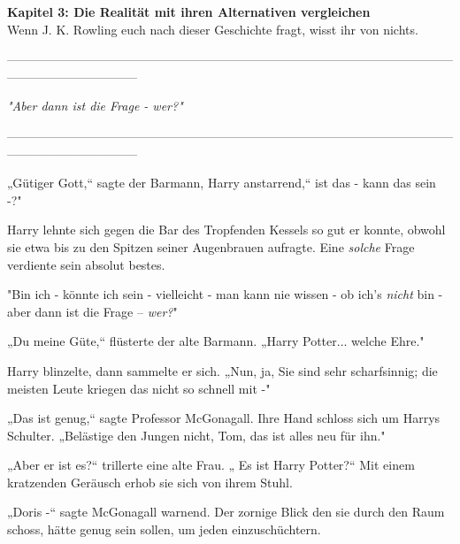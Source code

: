

\hypertarget{die-realituxe4t-mit-ihren-alternativen-vergleichen}{%

\textbf{Kapitel 3: Die Realität mit ihren Alternativen vergleichen}\\

\hfill\break Wenn J. K. Rowling euch nach dieser Geschichte fragt, wisst ihr von nichts.

--------------------------------------------------------------------------------------------------------------------------------------------

\hfill\break

\emph{"Aber dann ist die Frage - wer?"}

\hfill\break

--------------------------------------------------------------------------------------------------------------------------------------------

\hfill\break „Gütiger Gott,“ sagte der Barmann, Harry anstarrend,“ ist das - kann das sein -?"

Harry lehnte sich gegen die Bar des Tropfenden Kessels so gut er konnte, obwohl sie etwa bis zu den Spitzen seiner Augenbrauen aufragte. Eine \emph{solche} Frage verdiente sein absolut bestes.

"Bin ich - könnte ich sein - vielleicht - man kann nie wissen - ob ich's \emph{nicht} bin - aber dann ist die Frage -- \emph{wer?}"

„Du meine Güte,“ flüsterte der alte Barmann. „Harry Potter... welche Ehre."

Harry blinzelte, dann sammelte er sich. „Nun, ja, Sie sind sehr scharfsinnig; die meisten Leute kriegen das nicht so schnell mit -"

„Das ist genug,“ sagte Professor McGonagall. Ihre Hand schloss sich um Harrys Schulter. „Belästige den Jungen nicht, Tom, das ist alles neu für ihn."

„Aber er ist es?“ trillerte eine alte Frau. „ Es ist Harry Potter?“ Mit einem kratzenden Geräusch erhob sie sich von ihrem Stuhl.

„Doris -“ sagte McGonagall warnend. Der zornige Blick den sie durch den Raum schoss, hätte genug sein sollen, um jeden einzuschüchtern.

}
